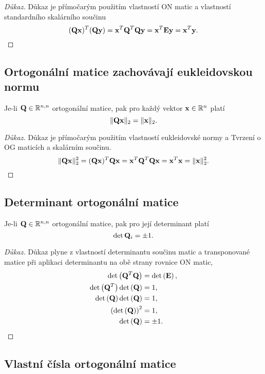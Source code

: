 \begin{proof}[Důkaz]
	Důkaz je přímočarým použitím vlastností ON matic a vlastností standardního skalárního součinu
	\[ (\mathbf{Q}\mathbf{x})^T(\mathbf{Q}\mathbf{y}) = \mathbf{x}^T \mathbf{Q}^T \mathbf{Q} \mathbf{y} = \mathbf{x}^T \mathbf{E} \mathbf{y} = \mathbf{x}^T \mathbf{y}. \]
\end{proof}

\subsection*{Ortogonální matice zachovávají eukleidovskou normu}

Je-li $\mathbf{Q} \in \mathbb{R}^{n,n}$ ortogonální matice, pak pro každý vektor $\mathbf{x} \in
	\mathbb{R}^n$ platí
\[ \| \mathbf{Q}\mathbf{x}\|_2 = \|\mathbf{x}\|_2. \]

\begin{proof}[Důkaz]
	Důkaz je přímočarým použitím vlastností eukleidovské normy a Tvrzení o OG maticích a skalárním součinu.
	\[ \| \mathbf{Q}\mathbf{x}\|_2^2 = (\mathbf{Q}\mathbf{x})^T\mathbf{Q}\mathbf{x} = \mathbf{x}^T\mathbf{Q}^T\mathbf{Q}\mathbf{x} = \mathbf{x}^T\mathbf{x} = \| \mathbf{x} \|_2^2. \]
\end{proof}

\subsection*{Determinant ortogonální matice}

Je-li $\mathbf{Q} \in \mathbb{R}^{n,n}$ ortogonální matice, pak pro její determinant platí
\[ \det \mathbf{Q}_i = \pm 1. \]

\begin{proof}[Důkaz]
	Důkaz plyne z vlastností determinantu součinu matic a transponované matice při aplikaci determinantu na obě strany rovnice ON matic,
	\begin{align*}
		\det \left( \mathbf{Q}^T \mathbf{Q} \right)                     & = \det \left(\mathbf{E} \right), \\
		\det \left( \mathbf{Q}^T \right) \det \left( \mathbf{Q} \right) & = 1,                      \\
		\det \left(\mathbf{Q} \right) \det \left(\mathbf{Q} \right)     & = 1,                      \\
		\left(\det \left(\mathbf{Q} \right) \right)^2            & = 1,                      \\
		\det \left(\mathbf{Q} \right)                            & = \pm 1.
	\end{align*}
\end{proof}

\subsection*{Vlastní čísla ortogonální matice}

